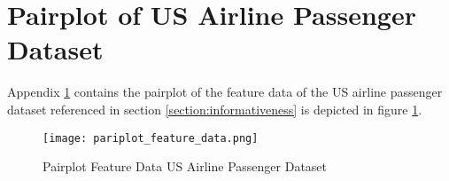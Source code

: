   \section[Pairplot]{Pairplot of US Airline Passenger Dataset}
  \label{App:pairplot}

  Appendix \ref{App:pairplot} contains the pairplot of the feature data of the 
  US airline passenger dataset referenced in section 
  \ref{section:informativeness} is depicted in figure \ref{fig:pairplot_feature}.

  \begin{figure}
		\centering
		\texttt{[image: pariplot\_feature\_data.png]}
		\caption{Pairplot Feature Data US Airline Passenger Dataset}
        \label{fig:pairplot_feature}
  \end{figure}

